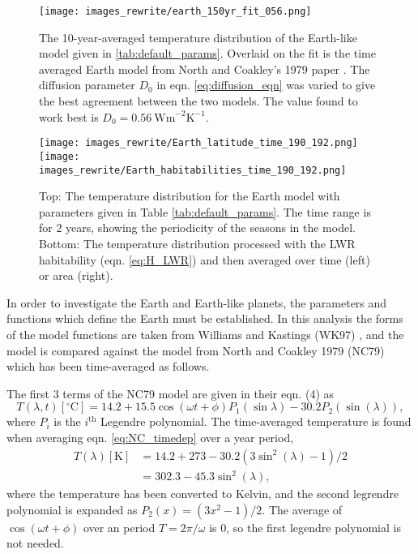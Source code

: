\documentclass[12pt, onecolumn]{revtex4-2}    %
\newcommand{\diffusion}{\ensuremath{\ \text{Wm}^{-2} \text{K}^{-1}}}
\newcommand{\degrees}{\ensuremath{^{\circ}}}
\begin{document}
\begin{figure}
  \texttt{[image: images\_rewrite/earth\_150yr\_fit\_056.png]}
  \caption{
    The 10-year-averaged temperature distribution of the Earth-like model given in \ref{tab:default_params}.
    Overlaid on the fit is the time averaged Earth model from North and Coakley's 1979 paper \cite{NC79}.
    The diffusion parameter $D_0$ in eqn. \eqref{eq:diffusion_eqn} was varied to give the best agreement between the two models.
    The value found to work best is $D_0 = 0.56 \diffusion$.
  }
  \label{fig:NC_fit}
\end{figure}

\begin{figure}
  \texttt{[image: images\_rewrite/Earth\_latitude\_time\_190\_192.png]}
  \texttt{[image: images\_rewrite/Earth\_habitabilities\_time\_190\_192.png]}
  \caption{
    Top: The temperature distribution for the Earth model with parameters given in Table \ref{tab:default_params}.
    The time range is for 2 years, showing the periodicity of the seasons in the model.
    Bottom: The temperature distribution processed with the LWR habitability (eqn. \eqref{eq:H_LWR}) and then averaged over time (left) or area (right).
  }
  \label{fig:Earth_lat_time}
\end{figure}

In order to investigate the Earth and Earth-like planets, the parameters and functions which define the Earth must be established.
In this analysis the forms of the model functions are taken from Williams and Kastings (WK97) \cite{WK97}, and the model is compared against the model from North and Coakley 1979 (NC79) \cite{NC79} which has been time-averaged as follows.

The first 3 terms of the NC79 model are given in their eqn. (4) as
\begin{equation}
  T(\lambda, t)[\degrees\text{C}] = 14.2 + 15.5 \cos(\omega t + \phi) P_1(\sin\lambda) - 30.2 P_2(\sin(\lambda)), \label{eq:NC_timedep}
\end{equation}
where $P_i$ is the $i^\text{th}$ Legendre polynomial.
The time-averaged temperature is found when averaging eqn. \eqref{eq:NC_timedep} over a year period,
\begin{equation}
  \begin{split}
    T(\lambda)[\text{K}] & = 14.2 + 273 - 30.2 (3 \sin^2(\lambda) - 1) / 2 \\
                         & = 302.3 - 45.3\sin^2(\lambda),
  \end{split}
  \label{eq:NC_timeavg}
\end{equation}
where the temperature has been converted to Kelvin, and the second legrendre polynomial is expanded as $P_2(x) =(3x^2-1) / 2$.
The average of $\cos(\omega t + \phi)$ over an period $T = 2\pi / \omega$ is $0$, so the first legendre polynomial is not needed.
\end{document}
